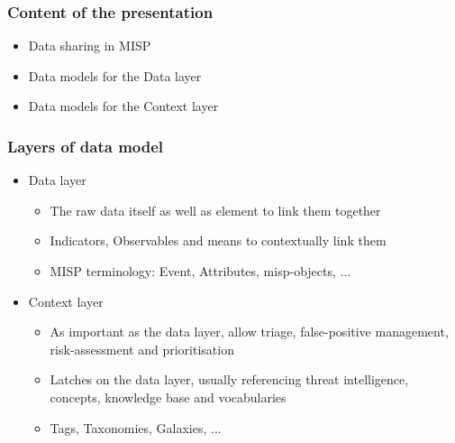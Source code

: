 
\begin{frame}[t,plain]
\titlepage
\end{frame}

\begin{frame}
    \frametitle{Content of the presentation}
    \begin{itemize}
        \item Data sharing in MISP
        \item Data models for the Data layer
        \item Data models for the Context layer
    \end{itemize}
\end{frame}

\begin{frame}
    \frametitle{Layers of data model}
     \begin{itemize}
            \item Data layer
            \begin{itemize}
                \item The raw data itself as well as element to link them together
                \item Indicators, Observables and means to contextually link them
                \item MISP terminology: Event, Attributes, misp-objects, ...
            \end{itemize}
            \vspace{1em}
            \item Context layer
            \begin{itemize}
                \item As important as the data layer, allow triage, false-positive management, risk-assessment and prioritisation
                \item Latches on the data layer, usually referencing threat intelligence, concepts, knowledge base and vocabularies
                \item Tags, Taxonomies, Galaxies, ...
            \end{itemize}
    \end{itemize}
\end{frame}

